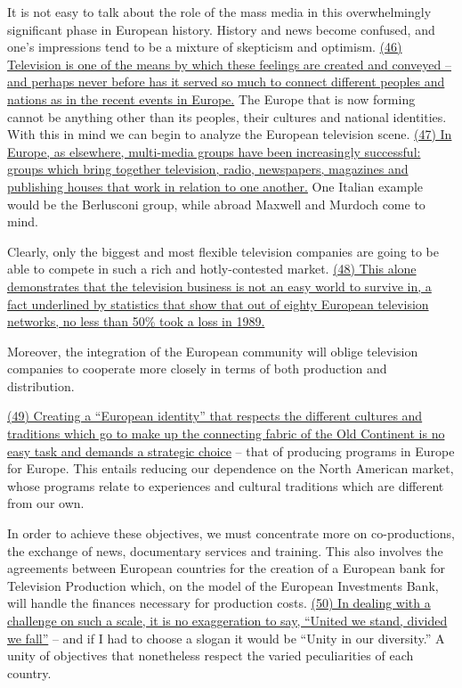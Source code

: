 
\qquad It is not easy to talk about the role of the mass media in this overwhelmingly significant phase in European history. History and news become confused, and one's impressions tend to be a mixture of skepticism and optimism. \ul{(46) Television is one of the means by which these feelings are created and conveyed -- and perhaps never before has it served so much to connect different peoples and nations as in the recent events in Europe.} The Europe that is now forming cannot be anything other than its peoples, their cultures and national identities. With this in mind we can begin to analyze the European television scene. \ul{(47) In Europe, as elsewhere, multi-media groups have been increasingly successful: groups which bring together television, radio, newspapers, magazines and publishing houses that work in relation to one another.} One Italian example would be the Berlusconi group, while abroad Maxwell and Murdoch come to mind.

\qquad Clearly, only the biggest and most flexible television companies are going to be able to compete in such a rich and hotly-contested market. \ul{(48) This alone demonstrates that the television business is not an easy world to survive in, a fact underlined by statistics that show that out of eighty European television networks, no less than 50\% took a loss in 1989.}

\qquad Moreover, the integration of the European community will oblige television companies to cooperate more closely in terms of both production and distribution.

\qquad \ul{(49) Creating a ``European identity'' that respects the different cultures and traditions which go to make up the connecting fabric of the Old Continent is no easy task and demands a strategic choice} -- that of producing programs in Europe for Europe. This entails reducing our dependence on the North American market, whose programs relate to experiences and cultural traditions which are different from our own.

\qquad In order to achieve these objectives, we must concentrate more on co-productions, the exchange of news, documentary services and training. This also involves the agreements between European countries for the creation of a European bank for Television Production which, on the model of the European Investments Bank, will handle the finances necessary for production costs. \ul{(50) In dealing with a challenge on such a scale, it is no exaggeration to say, ``United we stand, divided we fall''} -- and if I had to choose a slogan it would be ``Unity in our diversity.'' A unity of objectives that nonetheless respect the varied peculiarities of each country.